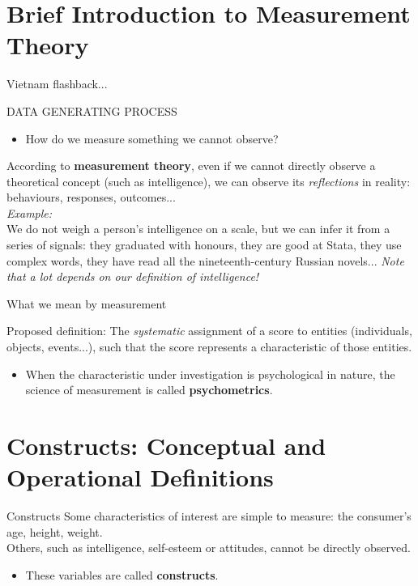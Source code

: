 \documentclass{beamer}
\begin{document}
\section{Brief Introduction to Measurement Theory}
\begin{frame}{Vietnam flashback...}
\begin{center}
   {\huge \alert{DATA GENERATING PROCESS}}
\end{center}
\vspace{0.5cm}
\begin{itemize}
    \item How do we measure something we cannot observe?
\end{itemize}
\pause
\vspace{0.5cm}
According to \textbf{measurement theory}, even if we cannot directly observe a theoretical concept (such as intelligence), we can observe its {\it reflections} in reality: behaviours, responses, outcomes... \\
\vspace{0.5 cm}
\footnotesize
{\it Example:} \\
We do not weigh a person's intelligence on a scale, but we can infer it from a series of signals: they graduated with honours, they are good at Stata, they use complex words, they have read all the nineteenth-century Russian novels... {\it Note that a lot depends on our definition of intelligence!}
\end{frame}

\begin{frame}{What we mean by measurement}
\begin{block}{Proposed definition:}
    The \textit{systematic} assignment of a score to entities (individuals, objects, events...), such that the score represents a characteristic of those entities.
\end{block}
\pause
\begin{itemize}
    \item When the characteristic under investigation is psychological in nature, the science of measurement is called \textbf{psychometrics}.
\end{itemize}
\end{frame}

\section{Constructs: Conceptual and Operational Definitions}
\begin{frame}{Constructs}
Some characteristics of interest are simple to measure: the consumer's age, height, weight. \\ Others, such as intelligence, self-esteem or attitudes, cannot be directly observed.
\begin{itemize}
    \item These variables are called \textbf{constructs}.
\end{itemize}
\end{frame}
\end{document}
